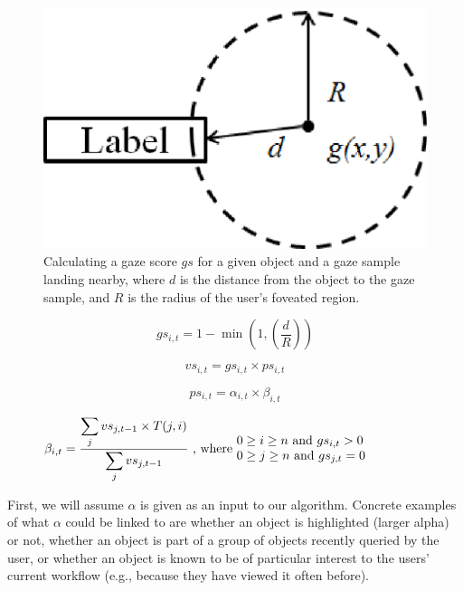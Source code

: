 \begin{figure}[htb]
  \centering
  \includegraphics[width=0.5\linewidth]{images/gazeScoreFig3.eps}
  \caption{Calculating a gaze score $gs$ for a given object and a gaze sample landing nearby, where $d$ is the distance from the object to the gaze sample, and $R$ is the radius of the user's foveated region. }
	\label{fig:gazeScoreFig3}
\end{figure}
\begin{equation}
gs_{i,t} = 1 - \min (1, (\frac{d}{R}))
\label{eq:GS}
\end{equation}

\begin{equation}
vs_{i,t} = gs_{i,t} \times ps_{i,t}
\label{eq:VS}
\end{equation}

\begin{equation}
ps_{i,t} = \alpha_{i,t} \times \beta_{i,t}
\label{eq:ps}
\end{equation}

\begin{equation}
\beta_{i,t} = \frac{\displaystyle\sum_{j} {vs_{j,t-1} \times T(j,i)}}{\displaystyle\sum_{j} vs_{j,t-1}} \text{ , where  } \parbox{15em}{$0\geq i \geq n$ and $gs_{i,t} > 0$\\ $0\geq j \geq n$ and $gs_{j,t} = 0$}
\label{eq:beta}
\end{equation}


First, we will assume $\alpha$ is given as an input to our algorithm. Concrete examples of what $\alpha$ could be linked to are whether an object is highlighted (larger alpha) or not, whether an object is part of a group of objects recently queried by the user, or whether an object is known to be of particular interest to the users' current workflow (e.g., because they have viewed it often before). 

